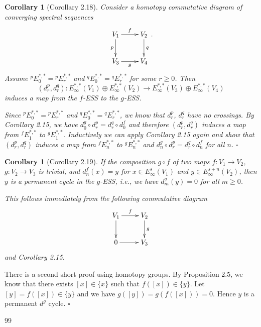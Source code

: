 \documentclass[12pt,a4paper]{article}
\renewenvironment{proof}{{\noindent\it\textbf{Proof}}\quad\it}{\hfill$\square$}
\newtheorem{cor}[equation]{Corollary}
\begin{document}
\begin{sloppy}
\begin{cor}[Corollary 2.18]
Consider a homotopy commutative diagram of converging spectral sequences
$$\xymatrix{
V_1 \ar[r]^{f}\ar[d]_{p} & V_2\ar[d]^{q}\\
V_3 \ar[r]_{g} & V_4
}.$$
Assume ${}^{p}E_0^{*,*}={}^{p}E_r^{*,*}$ and ${}^{q}E_0^{*,*}={}^{q}E_r^{*,*}$ for some $r\ge 0$. Then
$$(d^p_r, d^q_r): E_\infty^{*,*}(V_1)\oplus E_\infty^{*,*}(V_2)\to E_\infty^{*,*}(V_3)\oplus E_\infty^{*,*}(V_4)$$
induces a map from the $f$-ESS to the $g$-ESS.
\end{cor}
\begin{proof}
Since ${}^{p}E_0^{*,*}={}^{p}E_r^{*,*}$ and ${}^{q}E_0^{*,*}={}^{q}E_r^{*,*}$, we know that $d^p_r$, $d^q_r$ have no crossings. By Corollary 2.15, we have $d^g_0\circ d^p_r = d^q_r\circ d^f_0$ and therefore $(d^p_r, d^q_r)$ induces a map from ${}^{f}E_1^{*,*}$ to ${}^{g}E_1^{*,*}$. Inductively we can apply Corollary 2.15 again and show that $(d^p_r, d^q_r)$ induces a map from ${}^{f}E_n^{*,*}$ to ${}^{g}E_n^{*,*}$ and $d^g_n\circ d^p_r = d^q_r\circ d^f_n$ for all $n$.
\end{proof}

\begin{cor}[Corollary 2.19]
If the composition $g\circ f$ of two maps $f:V_1\to V_2$, $g:V_2\to V_3$ is trivial, and $d_n^f(x)=y$ for $x\in E_\infty^{s}(V_1)$ and $y\in E_\infty^{s+n}(V_2)$, then $y$ is a permanent cycle in the $g$-ESS, i.e., we have $d^g_m(y)=0$ for all $m\ge 0$.
\end{cor}
\begin{proof}
This follows immediately from the following commutative diagram
$$\xymatrix{
V_1 \ar[r]^{f}\ar[d] & V_2\ar[d]^{g}\\
0 \ar[r] & V_3
}$$
and Corollary 2.15.

There is a second short proof using homotopy groups. By Proposition 2.5, we know that there exists $[x]\in \{x\}$ such that $f([x])\in \{y\}$. Let $[y]=f([x])\in \{y\}$ and we have $g([y])=g(f([x]))=0$. Hence $y$ is a permanent $d^g$ cycle.
\end{proof}

\begin{thebibliography}{99}


\end{thebibliography}

\end{sloppy}
\end{document}
